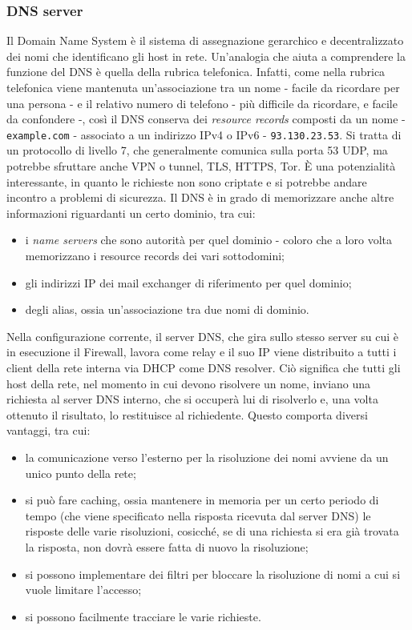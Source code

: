 \subsubsection{DNS server}
Il Domain Name System è il sistema di assegnazione gerarchico e decentralizzato dei nomi che identificano gli host in rete. Un'analogia che aiuta a comprendere la funzione del DNS è quella della rubrica telefonica.
Infatti, come nella rubrica telefonica viene mantenuta un'associazione tra un nome - facile da ricordare per una persona -  e il relativo numero di telefono - più difficile da ricordare, e facile da confondere -, così il DNS conserva dei \emph{resource records} composti da un nome - \texttt{example.com} - associato a un indirizzo IPv4 o IPv6 -  \texttt{93.130.23.53}.
Si tratta di un protocollo di livello 7, che generalmente comunica sulla porta 53 UDP, ma potrebbe sfruttare anche VPN o tunnel, TLS, HTTPS, Tor. È una potenzialità interessante, in quanto le richieste non sono criptate e si potrebbe andare incontro a problemi di sicurezza.
Il DNS è in grado di memorizzare anche altre informazioni riguardanti un certo dominio, tra cui:
\begin{itemize}
    \item i \emph{name servers} che sono autorità per quel dominio - coloro che a loro volta memorizzano i resource records dei vari sottodomini;
    \item gli indirizzi IP dei mail exchanger di riferimento per quel dominio;
    \item degli alias, ossia un'associazione tra due nomi di dominio.
\end{itemize}
Nella configurazione corrente, il server DNS, che gira sullo stesso server su cui è in esecuzione il Firewall, lavora come relay e il suo IP viene distribuito a tutti i client della rete interna via DHCP come DNS resolver.
Ciò significa che tutti gli host della rete, nel momento in cui devono risolvere un nome, inviano una richiesta al server DNS interno, che si occuperà lui di risolverlo e, una volta ottenuto il risultato, lo restituisce al richiedente.
Questo comporta diversi vantaggi, tra cui:
\begin{itemize}
    \item la comunicazione verso l'esterno per la risoluzione dei nomi avviene da un unico punto della rete;
    \item si può fare caching, ossia mantenere in memoria per un certo periodo di tempo (che viene specificato nella risposta ricevuta dal server DNS) le risposte delle varie risoluzioni, cosicché, se di una richiesta si era già trovata la risposta, non dovrà essere fatta di nuovo la risoluzione;
    \item si possono implementare dei filtri per bloccare la risoluzione di nomi a cui si vuole limitare l'accesso;
    \item si possono facilmente tracciare le varie richieste.
\end{itemize}


